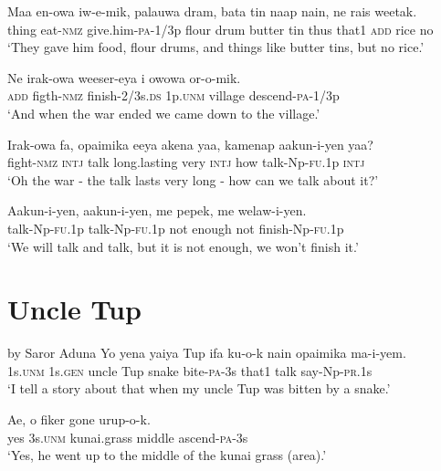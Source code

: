 \ea\label{ex:a:x127}
\gll  Maa  en-owa  iw-e-mik,  palauwa  dram,    bata  tin  naap  nain,  ne  rais  weetak. \\
thing  eat-\textsc{nmz}  give.him-\textsc{pa}-1/3p  flour  drum   butter  tin  thus  that1  \textsc{add}  rice  no \\


\glt ‘They gave him food, flour drums, and things like butter tins, but no rice.’ \\
\z


\ea\label{ex:a:x128}
\gll  Ne  irak-owa  weeser-eya  i  owowa  or-o-mik. \\
\textsc{add}  figth-\textsc{nmz}  finish-2/3s.\textsc{ds}  1p.\textsc{unm}  village  descend-\textsc{pa}-1/3p \\
\glt ‘And when the war ended we came down to the village.’ \\
\z


\ea\label{ex:a:x129}
\gll  Irak-owa  fa,  opaimika  eeya  akena  yaa,  kamenap  aakun-i-yen  yaa? \\
fight-\textsc{nmz}  \textsc{intj}  talk  long.lasting  very  \textsc{intj}  how       talk-Np-\textsc{fu}.1p  \textsc{intj} \\


\glt ‘Oh the war - the talk lasts very long - how can we talk about it?’ \\
\z


\ea\label{ex:a:x130}
\gll  Aakun-i-yen,  aakun-i-yen,  me  pepek,  me  welaw-i-yen. \\
talk-Np-\textsc{fu}.1p  talk-Np-\textsc{fu}.1p  not  enough  not  finish-Np-\textsc{fu}.1p \\
\glt ‘We will talk and talk, but it is not enough, we won’t finish it.’ \\
\z


\section{Uncle Tup} 
 by Saror Aduna
\ea\label{ex:a:x1}
\gll  Yo  yena  yaiya  Tup  ifa  ku-o-k  nain  opaimika     ma-i-yem. \\
1s.\textsc{unm}  1s.\textsc{gen}  uncle  Tup  snake  bite-\textsc{pa}-3s  that1  talk  say-Np-\textsc{pr}.1s \\
\glt ‘I tell a story about that when my uncle Tup was bitten by a snake.’ \\
\z


\ea\label{ex:a:x2}
\gll  Ae,  o  fiker  gone  urup-o-k. \\
yes  3s.\textsc{unm}  kunai.grass  middle  ascend-\textsc{pa}-3s \\
\glt ‘Yes, he went up to the middle of the kunai grass (area).’ \\
\z


